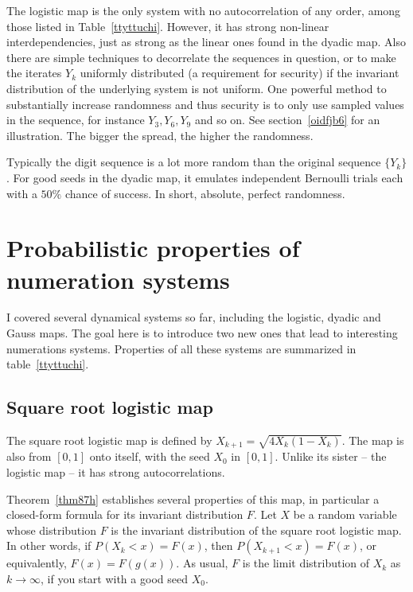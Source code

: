 \documentclass[oneside,10pt]{book}
\begin{document}
The logistic map is the only system with no autocorrelation of any order,  among those listed in Table~\ref{ttyttuchi}. However,
  it has strong non-linear interdependencies, just as strong as the linear ones found in the dyadic map. Also there are simple techniques
 to decorrelate the sequences in question, or to make the iterates $Y_k$ uniformly distributed (a requirement for security) if the invariant
 distribution of the underlying system is not uniform. One powerful method to substantially increase randomness and thus security
 is to only use sampled values in the sequence, for instance $Y_3, Y_6, Y_9$ and so on. See section~\ref{oidfjb6} for an illustration. The bigger the spread,
  the higher the randomness.

Typically the digit sequence is a lot more random than the original sequence $\{Y_k\}$. For good seeds in the dyadic map,
 it emulates independent Bernoulli trials each with a $50\%$ chance of success. In short, absolute, perfect randomness.





\section{Probabilistic properties of numeration systems}

I covered several dynamical systems so far, including the logistic, dyadic and Gauss maps. The goal here is to introduce two new ones that lead
 to interesting numerations systems. Properties of all these systems are summarized in table~\ref{ttyttuchi}.


\subsection{Square root logistic map}

The square root logistic map is defined by $X_{k+1}=\sqrt{4X_k(1-X_k)}$.
The map is also from $[0, 1]$ onto itself, with the seed $X_0$ in $[0, 1]$. Unlike its sister -- the logistic map -- it has strong
 autocorrelations.

Theorem~\ref{thm87h} establishes several properties of this map, in particular a closed-form formula for its invariant distribution $F$. Let $X$ be a random variable whose distribution $F$ is the invariant distribution of the square root logistic map. In other words,
 if $P(X_k<x) = F(x)$, then $P(X_{k+1}<x)=F(x)$, or equivalently, $F(x)=F(g(x))$. As usual, $F$ is the limit distribution
 of $X_k$ as $k\rightarrow\infty$, if you start with a \textcolor{index}{good seed} $X_0$.
\end{document}
